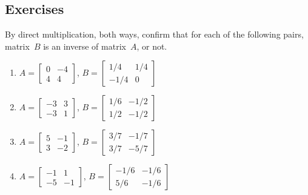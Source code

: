 \begin{comment}
Could have a section on GF(2): that is, inverses of 0-1 matrices mod 2??  Relevant to computer science encoding and encryption---somehow.  Matlab/octave supports modular computation via gf() something and some package, respectively.
\end{comment}





\subsection{Exercises}


\begin{exercise} \label{ex:abinv} 
By direct multiplication, both ways, confirm that for each of the following pairs, matrix~\(B\) is an inverse of matrix~\(A\), or not.
\begin{enumerate}
\item \(A=\begin{bmatrix} 0&-4
\\4&4 \end{bmatrix}\), 
\(B=\begin{bmatrix} 1/4&1/4
\\-1/4&0 \end{bmatrix}\)

\item \(A=\begin{bmatrix} -3&3
\\-3&1 \end{bmatrix}\), 
\(B=\begin{bmatrix} 1/6&-1/2
\\1/2&-1/2 \end{bmatrix}\)

\item \(A=\begin{bmatrix} 5&-1
\\3&-2 \end{bmatrix}\), 
\(B=\begin{bmatrix} 3/7&-1/7
\\3/7&-5/7 \end{bmatrix}\)

\item \(A=\begin{bmatrix} -1&1
\\-5&-1 \end{bmatrix}\), 
\(B=\begin{bmatrix} -1/6&-1/6
\\5/6&-1/6 \end{bmatrix}\)


\end{enumerate}
\end{exercise}
